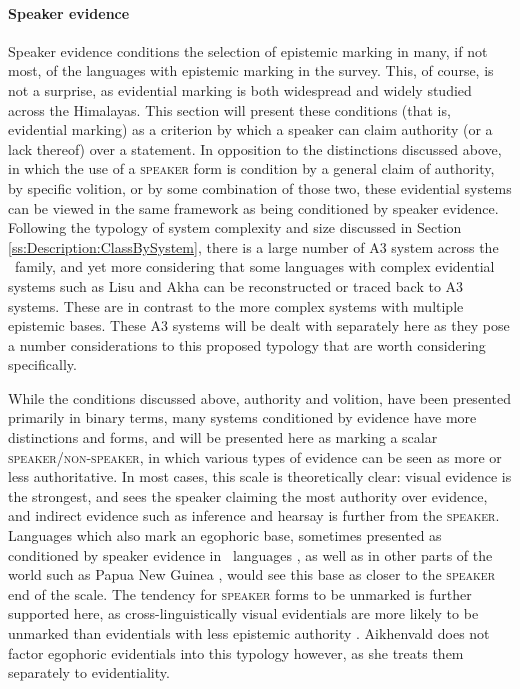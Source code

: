 \paragraph{Speaker evidence}
Speaker evidence conditions the selection of epistemic marking in many, if not most, of the languages with epistemic marking in the survey. This, of course, is not a surprise, as evidential marking is both widespread and widely studied across the Himalayas. This section will present these conditions (that is, evidential marking) as a criterion by which a speaker can claim authority (or a lack thereof) over a statement. In opposition to the distinctions discussed above, in which the use of a \textsc{speaker} form is condition by a general claim of authority, by specific volition, or by some combination of those two, these evidential systems can be viewed in the same framework as being conditioned by speaker evidence. Following the typology of system complexity and size discussed in Section \ref{ss:Description:ClassBySystem}, there is a large number of A3 system across the \lfam\ family, and yet more considering that some languages with complex evidential systems such as Lisu \cite{Bradley2002} and Akha \cite{Thurgood1986} can be reconstructed or traced back to A3 systems. These are in contrast to the more complex systems with multiple epistemic bases. These A3 systems will be dealt with separately here as they pose a number considerations to this proposed typology that are worth considering specifically. 

While the conditions discussed above, authority and volition, have been presented primarily in binary terms, many systems conditioned by evidence have more distinctions and forms, and will be presented here as marking a scalar \textsc{speaker}/\textsc{non-speaker}, in which various types of evidence can be seen as more or less authoritative. In most cases, this scale is theoretically clear: visual evidence is the strongest, and sees the speaker claiming the most authority over evidence, and indirect evidence such as inference and hearsay is further from the \textsc{speaker}. Languages which also mark an egophoric base, sometimes presented as conditioned by speaker evidence in \lfam\ languages \cite{Hill2017}, as well as in other parts of the world such as Papua New Guinea \cite{SanRoque2012}, would see this base as closer to the \textsc{speaker} end of the scale. The tendency for \textsc{speaker} forms to be unmarked is further supported here, as cross-linguistically visual evidentials are more likely to be unmarked than evidentials with less epistemic authority \cite[73]{Aikhenvald2004}. Aikhenvald does not factor egophoric evidentials into this typology however, as she treats them separately to evidentiality.


